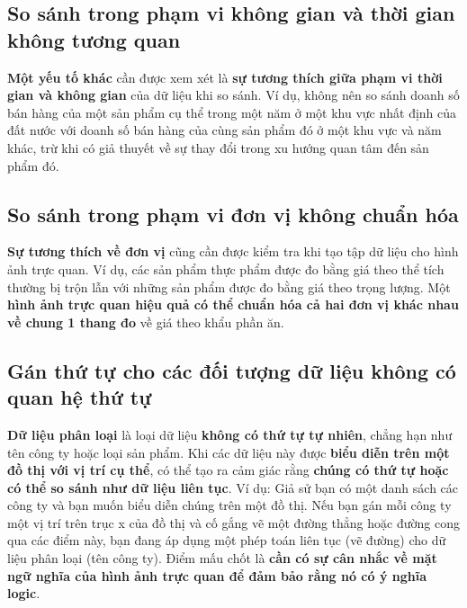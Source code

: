 \subsection{So sánh trong phạm vi không gian và thời gian không tương
quan}\label{so-suxe1nh-trong-phux1ea1m-vi-khuxf4ng-gian-vuxe0-thux1eddi-gian-khuxf4ng-tux1b0ux1a1ng-quan}

\textbf{Một yếu tố khác} cần được xem xét là \textbf{sự tương thích giữa
phạm vi thời gian và không gian} của dữ liệu khi so sánh. Ví dụ, không
nên so sánh doanh số bán hàng của một sản phẩm cụ thể trong một năm ở
một khu vực nhất định của đất nước với doanh số bán hàng của cùng sản
phẩm đó ở một khu vực và năm khác, trừ khi có giả thuyết về sự thay đổi
trong xu hướng quan tâm đến sản phẩm đó.

\subsection{So sánh trong phạm vi đơn vị không chuẩn
hóa}\label{so-suxe1nh-trong-phux1ea1m-vi-ux111ux1a1n-vux1ecb-khuxf4ng-chuux1ea9n-huxf3a}

\textbf{Sự tương thích về đơn vị} cũng cần được kiểm tra khi tạo tập dữ
liệu cho hình ảnh trực quan. Ví dụ, các sản phẩm thực phẩm được đo bằng
giá theo thể tích thường bị trộn lẫn với những sản phẩm được đo bằng giá
theo trọng lượng. Một \textbf{hình ảnh trực quan hiệu quả có thể chuẩn
hóa cả hai đơn vị khác nhau về chung 1 thang đo} về giá theo khẩu phần
ăn.

\subsection{Gán thứ tự cho các đối tượng dữ liệu không có quan hệ thứ
tự}\label{guxe1n-thux1ee9-tux1ef1-cho-cuxe1c-ux111ux1ed1i-tux1b0ux1ee3ng-dux1eef-liux1ec7u-khuxf4ng-cuxf3-quan-hux1ec7-thux1ee9-tux1ef1}

\textbf{Dữ liệu phân loại} là loại dữ liệu \textbf{không có thứ tự tự
nhiên}, chẳng hạn như tên công ty hoặc loại sản phẩm. Khi các dữ liệu
này được \textbf{biểu diễn trên một đồ thị với vị trí cụ thể}, có thể
tạo ra cảm giác rằng \textbf{chúng có thứ tự hoặc có thể so sánh như dữ
liệu liên tục}. Ví dụ: Giả sử bạn có một danh sách các công ty và bạn
muốn biểu diễn chúng trên một đồ thị. Nếu bạn gán mỗi công ty một vị trí
trên trục x của đồ thị và cố gắng vẽ một đường thẳng hoặc đường cong qua
các điểm này, bạn đang áp dụng một phép toán liên tục (vẽ đường) cho dữ
liệu phân loại (tên công ty). Điểm mấu chốt là \textbf{cần có sự cân
nhắc về mặt ngữ nghĩa của hình ảnh trực quan để đảm bảo rằng nó có ý
nghĩa logic}.

